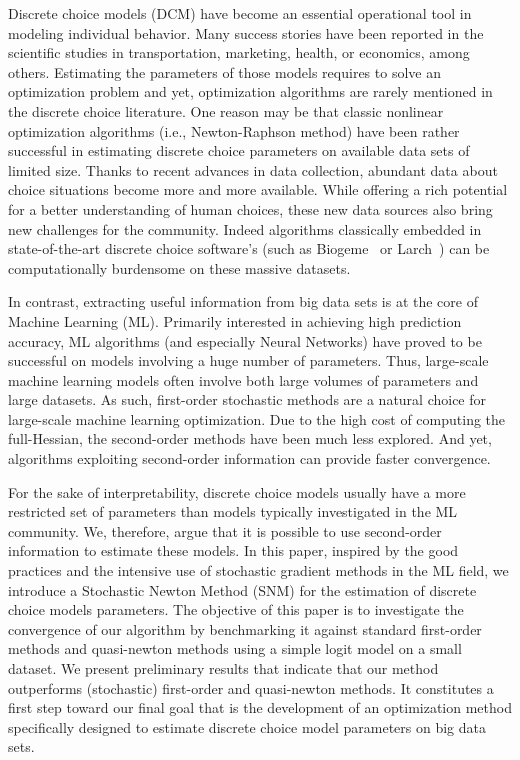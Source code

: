 \documentclass[conference]{IEEEtran}
\begin{document}
Discrete choice models (DCM) have become an essential operational tool in modeling individual behavior. Many success stories have been reported in the scientific studies in transportation, marketing, health, or economics, among others. Estimating the parameters of those models requires to solve an optimization problem and yet, optimization algorithms are rarely mentioned in the discrete choice literature. One reason may be that classic nonlinear optimization algorithms (i.e., Newton-Raphson method) have been rather successful in estimating discrete choice parameters on available data sets of limited size. Thanks to recent advances in data collection, abundant data about choice situations become more and more available. While offering a rich potential for a better understanding of human choices, these new data sources also bring new challenges for the community. Indeed algorithms classically embedded in state-of-the-art discrete choice software's (such as Biogeme~\cite{bierlaire_biogeme:_2003} or Larch~\cite{newman_larch:_2016}) can be computationally burdensome on these massive datasets. 

In contrast, extracting useful information from big data sets is at the core of Machine Learning (ML). Primarily interested in achieving high prediction accuracy, ML algorithms (and especially Neural Networks)  have proved to be successful on models involving a huge number of parameters. Thus, large-scale machine learning models often involve both large volumes of parameters and large datasets. As such, first-order stochastic methods are a natural choice for large-scale machine learning optimization.  Due to the high cost of computing the full-Hessian, the second-order methods have been much less explored. And yet, algorithms exploiting second-order information can provide faster convergence. 

For the sake of interpretability, discrete choice models usually have a more restricted set of parameters than models typically investigated in the ML community. We, therefore, argue that it is possible to use second-order information to estimate these models. In this paper, inspired by the good practices and the intensive use of stochastic gradient methods in the ML field, we introduce a Stochastic Newton Method (SNM) for the estimation of discrete choice models parameters. The objective of this paper is to investigate the convergence of our algorithm by benchmarking it against standard first-order methods and quasi-newton methods using a simple logit model on a small dataset. We present preliminary results that indicate that our method outperforms (stochastic) first-order and quasi-newton methods. It constitutes a first step toward our final goal that is the development of an optimization method specifically designed to estimate discrete choice model parameters on big data sets.
\end{document}
